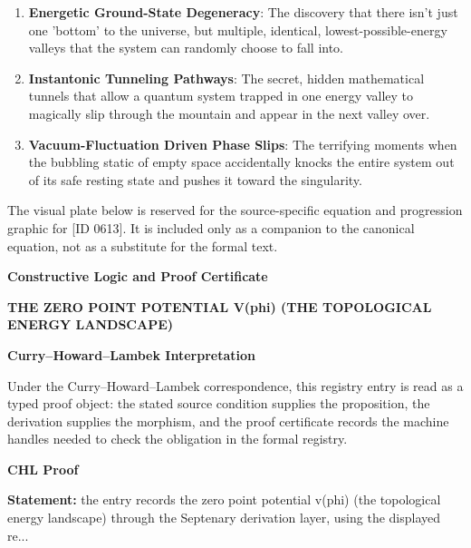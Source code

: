 \begin{enumerate}[leftmargin=1.6em,itemsep=6pt,topsep=4pt]
\item \textbf{Energetic Ground-State Degeneracy}: The discovery that there isn't just one 'bottom' to the universe, but multiple, identical, lowest-possible-energy valleys that the system can randomly choose to fall into.
\item \textbf{Instantonic Tunneling Pathways}: The secret, hidden mathematical tunnels that allow a quantum system trapped in one energy valley to magically slip through the mountain and appear in the next valley over.
\item \textbf{Vacuum-Fluctuation Driven Phase Slips}: The terrifying moments when the bubbling static of empty space accidentally knocks the entire system out of its safe resting state and pushes it toward the singularity.
\end{enumerate}

\begingroup\footnotesize\sloppy
The visual plate below is reserved for the source-specific equation and progression graphic for [ID 0613]. It is included only as a companion to the canonical equation, not as a substitute for the formal text.
\par\endgroup
\ifTZPDarkEdition
{}
\fi

\clearpage
\begingroup\tzpsupportsetup
\noindent\textbf{\fontsize{10.8pt}{12.8pt}\selectfont [ID 0613] Constructive Logic and Proof Certificate}\par
\noindent\textbf{\fontsize{10pt}{12pt}\selectfont THE ZERO POINT POTENTIAL V(phi) (THE TOPOLOGICAL ENERGY LANDSCAPE)}\par
\vspace{0.45em}
\begingroup
\footnotesize
\setlength{\parskip}{0.22em}
\setlength{\parindent}{0pt}
\noindent\textbf{Curry--Howard--Lambek Interpretation}\par
Under the Curry--Howard--Lambek correspondence, this registry entry is read as a typed proof
object: the stated source condition supplies the proposition, the derivation supplies the
morphism, and the proof certificate records the machine handles needed to check the obligation
in the formal registry.

\vspace{0.45em}
\noindent\textbf{CHL Proof}\par
\textbf{Statement:} the entry records the zero point potential v(phi) (the topological energy landscape)
through the Septenary derivation layer, using the displayed re...


